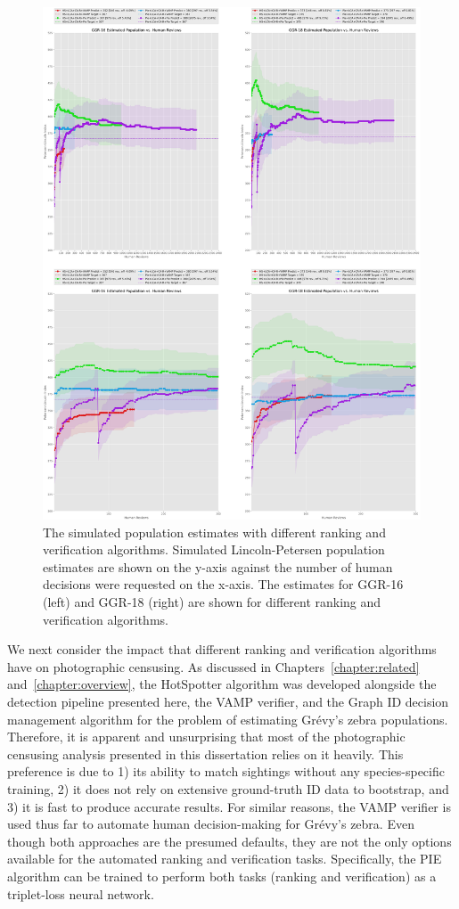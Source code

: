 \begin{figure}[!t]
    \begin{center}
        \includegraphics[width=0.82\linewidth]{resources/lca-decisions-compare-1.pdf}
    \end{center}
    \caption{The simulated population estimates with different ranking and verification algorithms.  Simulated Lincoln-Petersen population estimates are shown on the y-axis against the number of human decisions were requested on the x-axis.  The estimates for GGR-16 (left) and GGR-18 (right) are shown for different ranking and verification algorithms.}
    \label{fig:ca-sim-compare}
\end{figure}

We next consider the impact that different ranking and verification algorithms have on photographic censusing.  As discussed in Chapters~\ref{chapter:related} and~\ref{chapter:overview}, the HotSpotter algorithm was developed alongside the detection pipeline presented here, the VAMP verifier, and the Graph ID decision management algorithm for the problem of estimating Gr\'evy's zebra populations. Therefore, it is apparent and unsurprising that most of the photographic censusing analysis presented in this dissertation relies on it heavily.  This preference is due to 1) its ability to match sightings without any species-specific training, 2) it does not rely on extensive ground-truth ID data to bootstrap, and 3) it is fast to produce accurate results.  For similar reasons, the VAMP verifier is used thus far to automate human decision-making for Gr\'evy's zebra.  Even though both approaches are the presumed defaults, they are not the only options available for the automated ranking and verification tasks.  Specifically, the PIE~\cite{moskvyak_robust_2019} algorithm can be trained to perform both tasks (ranking and verification) as a triplet-loss neural network.

